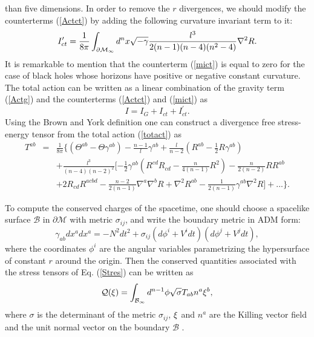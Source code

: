 \documentclass[a4paper,12pt,onecolumn]{revtex4}
\begin{document}
than five dimensions. In order to remove the $r$ divergences, we
should modify the counterterms (\ref{Actct}) by adding the
following curvature invariant term to it:
\begin{equation}
I_{ct}^{\prime }=\frac 1{8\pi }\int_{\partial \mathcal{M}_\infty }d^nx\sqrt{%
-\gamma }\frac{l^3}{2(n-1)(n-4)(n^2-4)}\nabla ^2R.  \label{mict}
\end{equation}
It is remarkable to mention that the counterterm (\ref{mict}) is
equal to zero for the case of black holes whose horizons have
positive or negative constant curvature. The total action can be
written as a linear combination of the gravity term (\ref{Actg})
and the counterterms (\ref{Actct}) and (\ref{mict}) as
\begin{equation}
I=I_G+I_{ct}+I_{ct}^{\prime }.  \label{totact}
\end{equation}
Using the Brown and York definition \cite{BY} one can construct a
divergence free stress-energy tensor from the total action
(\ref{totact}) as
\begin{eqnarray}
T^{ab} &=&\frac 1{8\pi } \{ (\Theta ^{ab}-\Theta \gamma ^{ab})-\frac{n-1}%
l\gamma ^{ab}+\frac l{n-2}(R^{ab}-\frac 12R\gamma ^{ab})  \nonumber \\
&&+\frac{l^3}{(n-4)(n-2)^2}[-\frac 12\gamma
^{ab}(R^{cd}R_{cd}-\frac
n{4(n-1)}R^2)-\frac{n}{2(n-2)}R R^{ab}  \nonumber \\
&&+2R_{cd}R^{acbd}-\frac{n-2}{2(n-1)}\nabla ^a\nabla ^bR+\nabla
^2R^{ab}-\frac 1{2(n-1)}\gamma ^{ab} \nabla ^2 R]+... \}.
\label{Stres}
\end{eqnarray}

To compute the conserved charges of the spacetime, one should choose a
spacelike surface $\mathcal{B}$ in $\partial \mathcal{M}$ with metric $%
\sigma _{ij}$, and write the boundary metric in ADM form:
\[
\gamma _{ab}dx^adx^a=-N^2dt^2+\sigma _{ij}\left( d\phi ^i+V^idt\right)
\left( d\phi ^j+V^jdt\right) ,
\]
where the coordinates $\phi ^i$ are the angular variables
parametrizing the hypersurface of constant $r$ around the origin.
Then the conserved quantities associated with the stress tensors
of Eq. (\ref{Stres}) can be written as
\begin{equation}
\mathcal{Q}(\mathcal{\xi )}=\int_{\mathcal{B}_\infty }d^{n-1}\phi \sqrt{%
\sigma }T_{ab}n^a\mathcal{\xi }^b,  \label{charge}
\end{equation}
where $\sigma $ is the determinant of the metric $\sigma _{ij}$, $\mathcal{%
\xi }$ and $n^a$ are the Killing vector field and the unit normal
vector on the boundary $\mathcal{B}$ .
\end{document}
